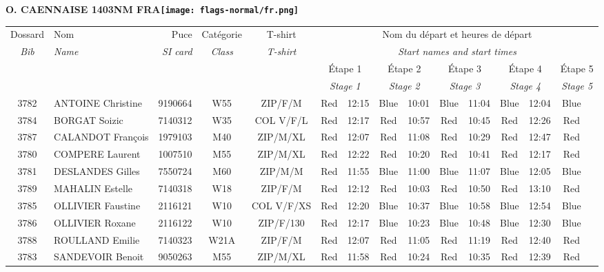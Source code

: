 \documentclass{report}
\begin{document}
\newpage
  \Huge \centering \bfseries O. CAENNAISE 1403NM FRA\normalfont \footnotesize \sffamily \hfill \texttt{[image: flags-normal/fr.png]} \newline 
  \begin{longtable}{|c|l|r|c|c|*{5}{cc|}}
    Dossard & Nom  & Puce    & Catégorie & T-shirt & \multicolumn{10}{c|}{Nom du départ et heures de départ} \\
    \itshape Bib     & \itshape Name & \itshape SI card & \itshape Class  & \itshape  T-shirt  & \multicolumn{10}{c|}{\itshape Start names and start times} \\
    \hline
    & & & & & \multicolumn{2}{c|}{Étape 1} & \multicolumn{2}{c|}{Étape 2} & \multicolumn{2}{c|}{Étape 3} & \multicolumn{2}{c|}{Étape 4} & \multicolumn{2}{c|}{Étape 5} \\
    & & & & & \multicolumn{2}{c|}{\itshape Stage 1} & \multicolumn{2}{c|}{\itshape Stage 2} & \multicolumn{2}{c|}{\itshape Stage 3} & \multicolumn{2}{c|}{\itshape Stage 4} & \multicolumn{2}{c|}{\itshape Stage 5} \\
    \hline
    3782 & ANTOINE Christine & 9190664 & W55 & ZIP/F/M & Red & 12:15 & Blue & 10:01 & Blue & 11:04 & Blue & 12:04 & Blue &  \\
    3784 & BORGAT Soizic & 7140312 & W35 & COL V/F/L & Red & 12:17 & Red & 10:57 & Red & 10:45 & Red & 12:26 & Red &  \\
    3787 & CALANDOT François & 1979103 & M40 & ZIP/M/XL & Red & 12:07 & Red & 11:08 & Red & 10:29 & Red & 12:47 & Red &  \\
    3780 & COMPERE Laurent & 1007510 & M55 & ZIP/M/XL & Red & 12:22 & Red & 10:20 & Red & 10:41 & Red & 12:17 & Red &  \\
    3781 & DESLANDES Gilles & 7550724 & M60 & ZIP/M/M & Red & 11:55 & Blue & 11:00 & Blue & 11:07 & Blue & 12:05 & Blue &  \\
    3789 & MAHALIN Estelle & 7140318 & W18 & ZIP/F/M & Red & 12:12 & Red & 10:03 & Red & 10:50 & Red & 13:10 & Red &  \\
    3785 & OLLIVIER Faustine & 2116121 & W10 & COL V/F/XS & Red & 12:20 & Blue & 10:37 & Blue & 10:58 & Blue & 12:54 & Blue &  \\
    3786 & OLLIVIER Roxane & 2116122 & W10 & ZIP/F/130 & Red & 12:17 & Blue & 10:23 & Blue & 10:48 & Blue & 12:30 & Blue &  \\
    3788 & ROULLAND Emilie & 7140323 & W21A & ZIP/F/M & Red & 12:07 & Red & 11:05 & Red & 11:19 & Red & 12:40 & Red &  \\
    3783 & SANDEVOIR Benoit & 9050263 & M55 & ZIP/M/XL & Red & 11:58 & Red & 10:24 & Red & 10:35 & Red & 12:39 & Red &  \\
  \end{longtable}
\end{document}
